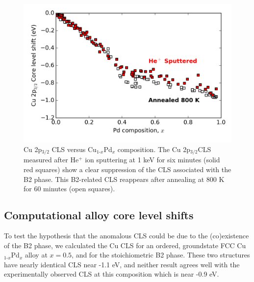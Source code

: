 \documentclass[number, sort&compress, review, 12pt]{elsarticle}
\begin{document}
\begin{figure}[H]
\centering
\includegraphics[width=6in]{./images/sputtering.png}
\caption{\label{fig-sputtering}Cu 2p$_{\text{3/2}}$ CLS versus Cu$_{\text{1-}x}$Pd$_x$ composition. The Cu 2p$_{\text{3/2}}$CLS measured after He$^{\text{+}}$ ion sputtering at 1 keV for six minutes (solid red squares) show a clear suppression of the CLS associated with the B2 phase. This B2-related CLS reappears after annealing at 800 K for 60 minutes (open squares).}
\end{figure}

\subsection{Computational alloy core level shifts}
\label{sec-3-3}
To test the hypothesis that the anomalous CLS could be due to the (co)existence of the B2 phase, we calculated the Cu CLS for an ordered, groundstate FCC Cu$_{\text{1-}x}$Pd$_x$ alloy at $x = 0.5$, and for the stoichiometric B2 phase. These two structures have nearly identical CLS near -1.1 eV, and neither result agrees well with the experimentally observed CLS at this composition which is near -0.9 eV.
\end{document}
